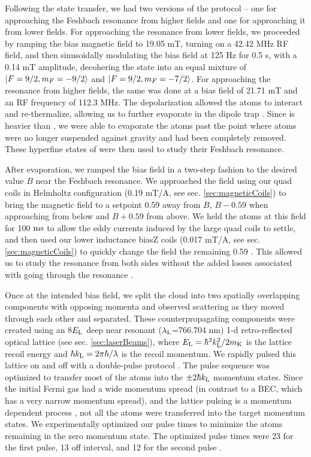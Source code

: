 Following the state transfer, we had two versions of the protocol \--- one for approaching the Feshbach resonance from higher fields and one for approaching it from lower fields. For approaching the resonance from lower fields, we proceeded by ramping the bias magnetic field to 19.05 mT, turning on a 42.42 MHz RF field, and then sinusoidally modulating the bias field at 125 Hz for 0.5 s, with a 0.14 mT amplitude, decohering the \K{} state into an equal mixture of $\mathinner{|{F=9/2,m_F=-9/2}\rangle}$ and $\mathinner{|{F=9/2,m_F=-7/2}\rangle}$. For approaching the resonance from higher fields, the same was done at a bias field of 21.71 mT and an RF frequency of 112.3 MHz. The depolarization allowed the \K{} atoms to interact and re-thermalize, allowing us to further evaporate in the dipole trap \cite{DeMarco99}. Since \Rb{} is heavier than \K{}, we were able to evaporate the \K{} atoms past the point where \Rb{} atoms were no longer suspended against gravity and had been completely removed.  These hyperfine states of \K{} were then used to study their Feshbach resonance.


After evaporation, we ramped the bias field in a two-step fashion to the desired value $B$ near the Feshbach resonance. We approached the field using our quad coils in Helmholtz configuration (0.19 mT/A, see sec. \ref{sec:magneticCoils}) to bring the magnetic field to a setpoint 0.59 \mT{} away from $B$,  $B-0.59$ \mT{} when approaching from below and $B+0.59$  \mT{} from above. We held the atoms at this field for 100 $\rm{ms}$ to allow the eddy currents induced by the large quad coils to settle, and then used our lower inductance biasZ coils (0.017 mT/A, see sec. \ref{sec:magneticCoils}) to quickly change the field the remaining 0.59 \mT{}. This allowed us to study the resonance from both sides without the added losses associated with going through the resonance \cite{Chin10}.

Once at the intended bias field, we split the cloud into two spatially overlapping components with opposing momenta  and observed scattering as they moved through each other and separated. These counterpropagating components were created using an  8$E_{\rm{L}}$ deep near resonant ($\lambda_{\rm{L}}$=766.704 nm) 1-d retro-reflected optical lattice (see sec. \ref{sec:laserBeams}), where $E_{\rm{L}}=\hbar^2 k_{\rm{L}}^2/2m_{\rm{K}}$ is the lattice recoil energy and $\hbar k_{\rm{L}}=2\pi \hbar/ \lambda$ is the recoil momentum. We rapidly pulsed this lattice on and off with a double-pulse protocol \cite{Wu05, Edwards10}. The pulse sequence was optimized to transfer most of the atoms into the $\pm 2 \hbar k_{\rm{L}}$ momentum states. Since the initial Fermi gas had a wide momentum spread (in contrast to a BEC, which has a very narrow momentum spread), and the lattice pulsing is a momentum dependent process  \cite{Wu05}, not all the atoms were transferred into the target momentum states. We experimentally optimized our pulse times to minimize the atoms remaining in the zero momentum state. The optimized pulse times were 23 \us{} for the first pulse, 13 \us{} off interval, and 12 \us{} for the second pulse \cite{Edwards10}.

